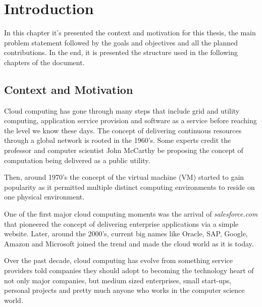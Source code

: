 \newcommand{\novathesis}{\emph{novathesis}}
\newcommand{\novathesisclass}{\texttt{novathesis.cls}}


\chapter{Introduction}
\label{cha:introduction}

In this chapter it's presented the context and motivation for this thesis, the main problem statement followed by the goals and objectives and all the planned contributions. In the end, it is presented the structure used in the following chapters of the document.

\section{Context and Motivation} %
\label{sec:context_and_motivation}

Cloud computing has gone through many steps that include grid and utility computing, application service provision and software as a service before reaching the level we know these days. The concept of delivering continuous resources through a global network is rooted in the 1960's. Some experts credit the professor and computer scientist John McCarthy \cite{john_mcCarthy:1} be proposing the concept of computation being delivered as a public utility.

Then, around 1970's the concept of the virtual machine (\gls{VM}) started to gain popularity as it permitted multiple distinct computing environments to reside on one physical environment.

One of the first major cloud computing moments was the arrival of \textit{salesforce.com} that pioneered the concept of delivering enterprise applications via a simple website. Later, around the 2000's, current big names like Oracle, SAP, Google, Amazon and Microsoft joined the trend and made the cloud world as it is today. \cite{cloud_history:1} \cite{cloud_history:2}

Over the past decade, cloud computing has evolve from something service providers told companies they should adopt to becoming the technology heart of not only major companies, but medium sized enterprises, small start-ups, personal projects and pretty much anyone who works in the computer science world. 

